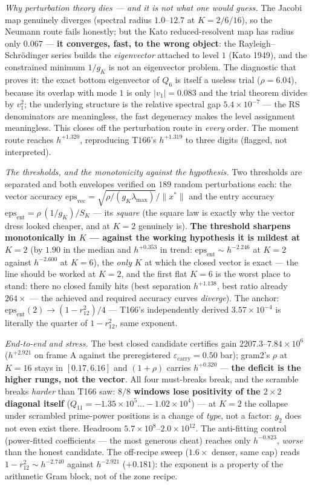 \documentclass[11pt,a4paper]{article}
\begin{document}
\emph{Why perturbation theory dies --- and it is not what one would
guess.} The Jacobi map genuinely diverges (spectral radius $1.0$--$12.7$
at $K=2/6/16$), so the Neumann route fails honestly; but the Kato
reduced-resolvent map has radius only $0.067$ --- \textbf{it converges,
fast, to the wrong object}: the Rayleigh--Schr\"odinger series builds the
\emph{eigenvector} attached to level $1$ (Kato 1949), and the constrained
minimum $1/g_K$ is not an eigenvector problem. The diagnostic that proves
it: the exact bottom eigenvector of $Q_6$ is itself a useless trial
($\rho=6.04$), because its overlap with mode $1$ is only $|v_1|=0.083$ and
the trial theorem divides by $v_1^2$; the underlying structure is the
relative spectral gap $5.4\times10^{-7}$ --- the RS denominators are
meaningless, the fast degeneracy makes the level assignment meaningless.
This closes off the perturbation route in \emph{every} order. The moment
route reaches $h^{+1.320}$, reproducing T166's $h^{+1.319}$ to three
digits (flagged, not interpreted).

\emph{The thresholds, and the monotonicity against the hypothesis.} Two
thresholds are separated and both envelopes verified on $189$ random
perturbations each: the vector accuracy
$\mathrm{eps}_{\mathrm{vec}}=\sqrt{\rho/(g_K\lambda_{\max})}/\|x^*\|$ and
the entry accuracy $\mathrm{eps}_{\mathrm{ent}}=\rho\,(1/g_K)/S_K$ --- its
\emph{square} (the square law is exactly why the vector dress looked
cheaper, and at $K=2$ genuinely is). \textbf{The threshold sharpens
monotonically in $K$ --- against the working hypothesis it is mildest at
$K=2$} (by $1.90$ in the median and $h^{+0.353}$ in trend:
$\mathrm{eps}_{\mathrm{ent}}\sim h^{-2.246}$ at $K=2$ against $h^{-2.600}$
at $K=6$), the \emph{only} $K$ at which the closed vector is exact --- the
line should be worked at $K=2$, and the first flat $K=6$ is the worst
place to stand: there no closed family hits (best separation $h^{+1.138}$,
best ratio already $264\times$ --- the achieved and required accuracy
curves \emph{diverge}). The anchor:
$\mathrm{eps}_{\mathrm{ent}}(2)\to(1-r_{12}^2)/4$ --- T166's independently
derived $3.57\times10^{-4}$ is literally the quarter of $1-r_{12}^2$, same
exponent.

\emph{End-to-end and stress.} The best closed candidate certifies gain
$2207.3$--$7.84\times10^{6}$ ($h^{+2.921}$ on frame A against the
preregistered $\varepsilon_{\mathrm{carry}}=0.50$ bar); gram2's $\rho$ at
$K=16$ stays in $[0.17,6.16]$ and $(1+\rho)$ carries $h^{+0.320}$ ---
\textbf{the deficit is the higher rungs, not the vector}. All four
must-breaks break, and the scramble breaks \emph{harder} than T166 saw:
\textbf{$8/8$ windows lose positivity of the $2\times2$ diagonal itself}
($Q_{11}=-1.35\times10^{5}\ldots-1.02\times10^{4}$) --- at $K=2$ the
collapse under scrambled prime-power positions is a change of \emph{type},
not a factor: $g_2$ does not even exist there. Headroom
$5.7\times10^{8}$--$2.0\times10^{12}$. The anti-fitting control
(power-fitted coefficients --- the most generous cheat) reaches only
$h^{-0.823}$, \emph{worse} than the honest candidate. The off-recipe sweep
($1.6\times$ denser, same cap) reads $1-r_{12}^2\sim h^{-2.740}$ against
$h^{-2.921}$ ($+0.181$): the exponent is a property of the arithmetic Gram
block, not of the zone recipe.
\end{document}
